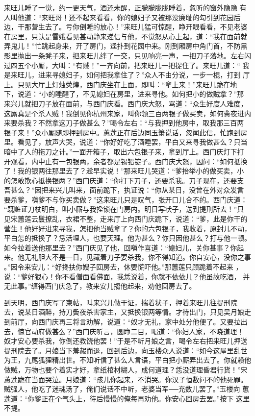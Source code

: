 来旺儿睡了一觉，约一更天气，酒还未醒，正朦朦胧胧睡着，忽听的窗外隐隐
有人叫他道：“来旺哥！还不起来看看，你的媳妇子又被那没廉耻的勾引到花园后
边，干那营生去了。亏你倒睡的放心！”来旺儿猛可惊醒，睁开眼看看，不见老婆
在房里，只认是雪娥看见甚动静来递信与他，不觉怒从心上起，道：“我在面前就
弄鬼儿！”忙跳起身来，开了房门，迳扑到花园中来。刚到厢房中角门首，不防黑
影里抛出一条凳子来，把来旺儿绊了一交，只见响亮一声，一把刀子落地。左右闪
过四五个小厮，大叫：“有贼！”一齐向前，把来旺儿一把捉住了。来旺儿道：“
我是来旺儿，进来寻媳妇子，如何把我拿住了？”众人不由分说，一步一棍，打到
厅上。只见大厅上灯烛荧煌，西门庆坐在上面，即叫：“拿上来！”来旺儿跪在地
下，说道：“小的睡醒了，不见媳妇在房里，进来寻他。如何把小的做贼拿？”那
来兴儿就把刀子放在面前，与西门庆看。西门庆大怒，骂道：“众生好度人难度，
这厮真是个杀人贼！我倒见你杭州来家，叫你领三百两银子做买卖，如何夤夜进内
来要杀我？不然拿这刀子做甚么？”喝令左右：“与我押到他房中，取我那三百两
银子来！”众小厮随即押到房中。蕙莲正在后边同玉箫说话，忽闻此信，忙跑到房
里。看见了，放声大哭，说道：“你好好吃了酒睡罢，平白又来寻我做甚么？只当
暗中了人的拖刀之计。”一面开箱子，取出六包银子来，拿到厅上。西门庆灯下打
开观看，内中止有一包银两，余者都是锡铅锭子。西门庆大怒，因问：“如何抵换
了！我的银两往那里去了？趁早实说！”那来旺儿哭道：“爹抬举小的做买卖，小
的怎敢欺心抵换银两？”西门庆道：“你打下刀子，还要杀我。刀子现在，还要支
吾甚么？”因把来兴儿叫来，面前跪下，执证说：“你从某日，没曾在外对众发言
要杀爹，嗔爹不与你买卖做？”这来旺儿只是叹气，张开口儿合不的。西门庆道：
“既赃证刀杖明白，叫小厮与我拴锁在门房内。明日写状子，送到提刑所去！”只
见宋蕙莲云鬟撩乱，衣裙不整，走来厅上向西门庆跪下，说道：“爹，此是你干的
营生！他好好进来寻我，怎把他当贼拿了？你的六包银子，我收着，原封儿不动，
平白怎的抵换了？恁活埋人，也要天理。他为甚么？你只因他甚么？打与他一顿。
如今拉着送他那里去？”西门庆见了他，回嗔作喜道：“媳妇儿，关你甚事？你起
来。他无礼胆大不是一日，见藏着刀子要杀我，你不得知道。你自安心，没你之事
。”因令来安儿：“好搀扶你嫂子回房去，休要慌吓他。”那蕙莲只顾跪着不起来
，说：“爹好狠心！你不看僧面看佛面，我恁说着，你就不依依儿？他虽故吃酒，
并无此事。”缠得西门庆急了，教来安儿搊他起来，劝他回房去了。

到天明，西门庆写了柬帖，叫来兴儿做干证，揣着状子，押着来旺儿往提刑院
去，说某日酒醉，持刀夤夜杀害家主，又抵换银两等情。才待出门，只见吴月娘走
到前厅，向西门庆再三将言劝解，说道：“奴才无礼，家中处分他便了。又要拉出
去，惊官动府做甚么？”西门庆听言，圆睁二目，喝道：“你妇人家，不晓道理！
奴才安心要杀我，你倒还教饶他罢！”于是不听月娘之言，喝令左右把来旺儿押送
提刑院去了。月娘当下羞赧而退，回到后边，向玉楼众人说道：“如今这屋里乱世
为王，九尾狐狸精出世。不知听信了甚么人言语，平白把小厮弄出去了。你就赖他
做贼，万物也要个着实才好，拿纸棺材糊人，成何道理？恁没道理昏君行货！”宋
蕙莲跪在当面哭泣。月娘道：“孩儿你起来，不消哭。你汉子恒数问不的他死罪。
贼强人，他吃了迷魂汤了，俺们说话不中听，老婆当军──充数儿罢了。”玉楼向
蕙莲道：“你爹正在个气头上，待后慢慢的俺每再劝他。你安心回房去罢。”按下
这里不提。

